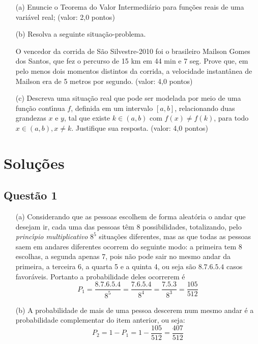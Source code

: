 \documentclass{report}
\begin{document}
\begin{enumerate}

\item[(a)] Enuncie o Teorema do Valor Intermedi\'ario para fun\c c\~oes reais de uma vari\'avel real; (valor: 2,0 pontos)

\item[(b)] Resolva a seguinte situa\c c\~ao-problema.

O vencedor da corrida de S\~ao Silvestre-2010 foi o brasileiro Mailson Gomes dos Santos, que fez o percurso de 15 km em 44 min e 7 seg. Prove que, em pelo menos dois momentos distintos da corrida, a velocidade instant\^anea de Mailson era de 5 metros por segundo. (valor: 4,0 pontos)

\item[(c)] Descreva uma situa\c c\~ao real que pode ser modelada por meio de uma fun\c c\~ao cont\'\i nua $f$, definida em um intervalo $[a , b]$, relacionando duas grandezas $x$ e $y$, tal que existe $k\in (a , b)$ com $f(x) \neq f(k)$, para todo $x\in (a , b), x \neq k$. Justifique sua resposta. (valor: 4,0 pontos)

\end{enumerate}

\section{\color{red} Solu\c c\~oes}

\subsection{\color{red} Quest\~ao 1}

\begin{enumerate}

\item[(a)] Considerando que as pessoas escolhem de forma aleat\'oria o andar que desejam ir, cada uma das pessoas t\^em 8 possibilidades, totalizando, pelo {\it princ\'\i pio multiplicativo} $8^5$ situa\c c\~oes diferentes, mas as que todas as pessoas saem em andares diferentes ocorrem do seguinte modo: a primeira tem 8 escolhas, a segunda apenas 7, pois n\~ao pode sair no mesmo andar da primeira, a terceira 6, a quarta 5 e a quinta 4, ou seja s\~ao $8.7.6.5.4$ casos favor\'aveis. Portanto a probabilidade deles ocorrerem \'e $$P_1= \frac{8.7.6.5.4}{8^5}=\frac{7.6.5.4}{8^4}=\frac{7.5.3}{8^3}=\frac{105}{512}$$

\item[(b)] A probabilidade de mais de uma pessoa descerem num mesmo andar \'e a probabilidade complementar do item anterior, ou seja: $$P_2=1-P_1=1-\frac{105}{512}=\frac{407}{512}$$

\end{enumerate}
\end{document}
